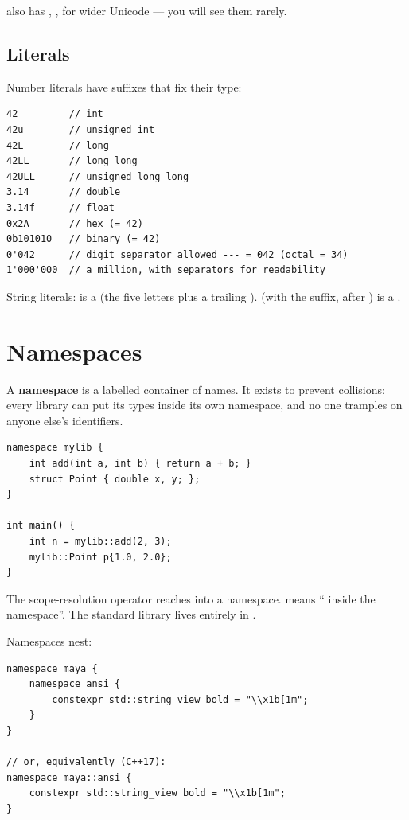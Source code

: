 \cpp{} also has , , 
for wider Unicode --- you will see them rarely.

\subsection{Literals}

Number literals have suffixes that fix their type:

\begin{lstlisting}
42         // int
42u        // unsigned int
42L        // long
42LL       // long long
42ULL      // unsigned long long
3.14       // double
3.14f      // float
0x2A       // hex (= 42)
0b101010   // binary (= 42)
0'042      // digit separator allowed --- = 042 (octal = 34)
1'000'000  // a million, with separators for readability
\end{lstlisting}

String literals:  is a  (the five
letters plus a trailing ). 
(with the  suffix, after ) is a .

\section{Namespaces}
\label{sec:cpp:namespaces}

A \textbf{namespace} is a labelled container of names. It exists to
prevent collisions: every library can put its types inside its own
namespace, and no one tramples on anyone else's identifiers.

\begin{lstlisting}
namespace mylib {
    int add(int a, int b) { return a + b; }
    struct Point { double x, y; };
}

int main() {
    int n = mylib::add(2, 3);
    mylib::Point p{1.0, 2.0};
}
\end{lstlisting}

The scope-resolution operator \code{::} reaches into a namespace.
 means `` inside the 
namespace''. The standard library lives entirely in .

Namespaces nest:

\begin{lstlisting}
namespace maya {
    namespace ansi {
        constexpr std::string_view bold = "\\x1b[1m";
    }
}

// or, equivalently (C++17):
namespace maya::ansi {
    constexpr std::string_view bold = "\\x1b[1m";
}
\end{lstlisting}

